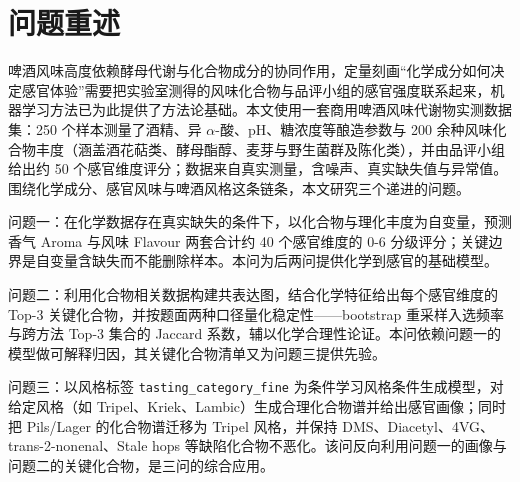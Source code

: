 \documentclass[zihao=-4,a4paper,UTF8,fontset=none]{ctexart}
\begin{document}
\makeatletter
\renewcommand*\l@section[2]{%
  \ifnum \c@tocdepth >\z@
    \addpenalty\@secpenalty
    \addvspace{0.20em \@plus\p@}%
    \setlength\@tempdima{1.5em}%
    \begingroup
      \parindent \z@ \rightskip \@pnumwidth
      \parfillskip -\@pnumwidth
      \leavevmode \bfseries
      \advance\leftskip\@tempdima
      \hskip -\leftskip
      #1\nobreak\hfil
      \nobreak\hb@xt@\@pnumwidth{\hss #2}\par
    \endgroup
  \fi}
\makeatother

\setcounter{tocdepth}{2}
{\linespread{1.00}\selectfont{}
\tableofcontents}
\thispagestyle{empty}
\clearpage
\pagestyle{fancy}
\section{问题重述}

啤酒风味高度依赖酵母代谢与化合物成分的协同作用，定量刻画“化学成分如何决定感官体验”需要把实验室测得的风味化合物与品评小组的感官强度联系起来，机器学习方法已为此提供了方法论基础\cite{b1,b2,b3}。本文使用一套商用啤酒风味代谢物实测数据集：250 个样本测量了酒精、异 $\alpha$-酸、pH、糖浓度等酿造参数与 200 余种风味化合物丰度（涵盖酒花萜类、酵母酯醇、麦芽与野生菌群及陈化类），并由品评小组给出约 50 个感官维度评分；数据来自真实测量，含噪声、真实缺失值与异常值。围绕化学成分、感官风味与啤酒风格这条链条，本文研究三个递进的问题。

问题一：在化学数据存在真实缺失的条件下，以化合物与理化丰度为自变量，预测香气 Aroma 与风味 Flavour 两套合计约 40 个感官维度的 0-6 分级评分；关键边界是自变量含缺失而不能删除样本。本问为后两问提供化学到感官的基础模型。

问题二：利用化合物相关数据构建共表达图，结合化学特征给出每个感官维度的 Top-3 关键化合物，并按题面两种口径量化稳定性——bootstrap 重采样入选频率与跨方法 Top-3 集合的 Jaccard 系数，辅以化学合理性论证。本问依赖问题一的模型做可解释归因，其关键化合物清单又为问题三提供先验。

问题三：以风格标签 \texttt{tasting\_\allowbreak{}category\_\allowbreak{}fine} 为条件学习风格条件生成模型，对给定风格（如 Tripel、Kriek、Lambic）生成合理化合物谱并给出感官画像；同时把 Pils/Lager 的化合物谱迁移为 Tripel 风格，并保持 DMS、Diacetyl、4VG、trans-2-nonenal、Stale hops 等缺陷化合物不恶化。该问反向利用问题一的画像与问题二的关键化合物，是三问的综合应用。
\end{document}
